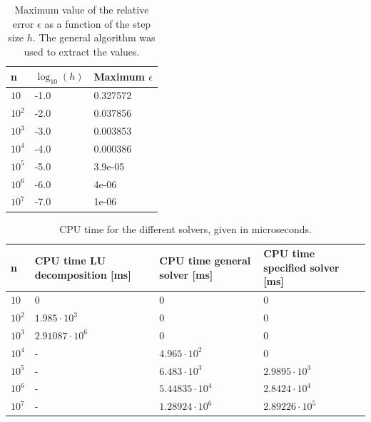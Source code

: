 \documentclass[english, nofootinbib]{revtex4-1}  %
\begin{document}
\begin{table}[h!]
\centering
\setlength{\tabcolsep}{12pt}
 \begin{tabular}{l  l  l} 
 \hline
n & $\log_{10}(h)$ & Maximum $\epsilon$ \\ [0.5ex] 
 \hline\hline
$10$ & -1.0 & 0.327572\\ 

$10^2$& -2.0 & 0.037856\\

$10^3$ & -3.0 & 0.003853 \\
 
$10^4$& -4.0 & 0.000386 \\

$10^5$ & -5.0 & 3.9e-05 \\ 

$10^6$ & -6.0 & 4e-06 \\ 

$10^7$ & -7.0 & 1e-06 \\ 
\hline
\hline
\end{tabular}
\caption{Maximum value of the relative error $\epsilon$ as a function of the step size $h$. The general algorithm was used to extract the values.}
\label{table:relative_error}
\end{table}


\begin{table}[h!]
\centering
\setlength{\tabcolsep}{12pt}
 \begin{tabular}{l  l  l  l} 
 \hline
n & CPU time LU decomposition [ms] & CPU time general solver [ms] & CPU time specified solver [ms]\\ [0.5ex] 
 \hline\hline
$10$ & 0 & 0 & 0\\ 

$10^2$& $1.985\cdot 10^3$ & 0 & 0  \\

$10^3$ & $2.91087\cdot 10^6$ & 0 & 0  \\ 

$10^4$ & - & $4.965\cdot 10^2$ & 0 \\ 

$10^5$ & - & $6.483 \cdot 10^3$ & $2.9895\cdot 10^3$ \\ 

$10^6$ &- & $5.44835\cdot 10^4$ & $2.8424\cdot 10^4$ \\ 

$10^7$ &- & $1.28924\cdot 10^6$ & $2.89226\cdot 10^5$ \\ 
\hline
\hline
\end{tabular}
\caption{CPU time for the different solvers, given in microseconds.}
\label{table:CPU_time}
\end{table}
\end{document}
